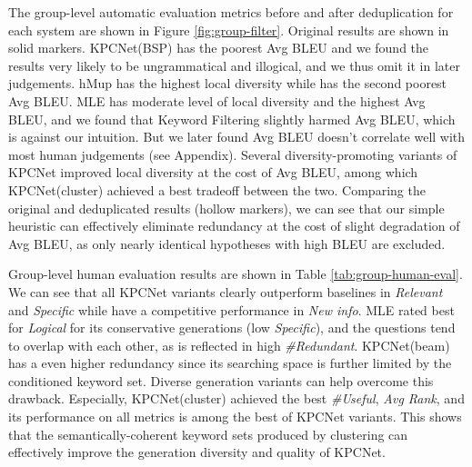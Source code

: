 \documentclass[letterpaper]{article} %
\begin{document}
The group-level automatic evaluation metrics before and after deduplication for each system are shown in Figure \ref{fig:group-filter}. Original results are shown in solid markers. KPCNet(BSP) has the poorest Avg BLEU and we found the results very likely to be ungrammatical and illogical, and we thus omit it in later judgements. hMup has the highest local diversity while has the second poorest Avg BLEU. MLE has moderate level of local diversity and the highest Avg BLEU, and we found that Keyword Filtering slightly harmed Avg BLEU, which is against our intuition. But we later found Avg BLEU doesn't correlate well with most human judgements (see Appendix). Several diversity-promoting variants of KPCNet improved local diversity at the cost of Avg BLEU, among which KPCNet(cluster) achieved a best tradeoff between the two. Comparing the original and deduplicated results (hollow markers), we can see that our simple heuristic can effectively eliminate redundancy at the cost of slight degradation of Avg BLEU, as only nearly identical hypotheses with high BLEU are excluded. 

Group-level human evaluation results are shown in Table \ref{tab:group-human-eval}. We can see that all KPCNet variants clearly outperform baselines in \textit{Relevant} and \textit{Specific} while have a competitive performance in \textit{New info}. MLE rated best for \textit{Logical} for its conservative generations (low \textit{Specific}), and the questions tend to overlap with each other, as is reflected in high \textit{\#Redundant}. KPCNet(beam) has a even higher redundancy since its searching space is further limited by the conditioned keyword set. Diverse generation variants can help overcome this drawback. Especially, KPCNet(cluster) achieved the best \textit{\#Useful}, \textit{Avg Rank}, and its performance on all metrics is among the best of KPCNet variants. This shows that the semantically-coherent keyword sets produced by clustering can effectively improve the generation diversity and quality of KPCNet. 
\end{document}
